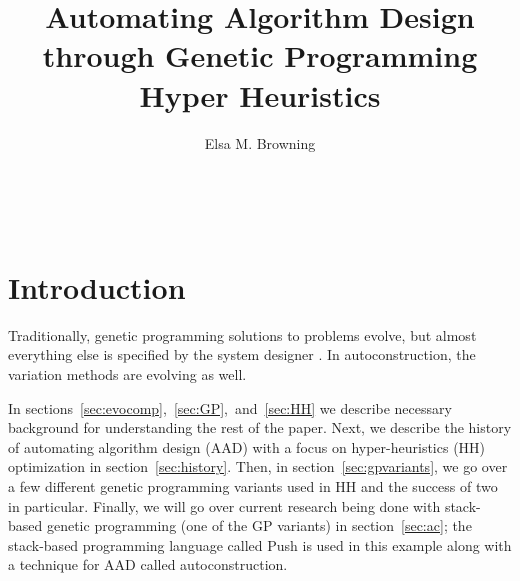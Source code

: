 \documentclass{sig-alternate}
\begin{document}

\title{Automating Algorithm Design through Genetic Programming Hyper Heuristics}


\author{
\alignauthor
Elsa M. Browning\\
	\\
	\\
	\\
}

\maketitle
\begin{abstract}
	
\end{abstract}


\section{Introduction}
\label{sec:introduction}

Traditionally, genetic programming solutions to problems evolve, but almost everything else is specified by the system designer \cite{spector:2016}. In autoconstruction, the variation methods are evolving as well.

In sections~\ref{sec:evocomp},~\ref{sec:GP},~and~\ref{sec:HH} we describe necessary background for understanding the rest of the paper. Next, we describe the history of automating algorithm design (AAD) with a focus on hyper-heuristics (HH) optimization in section~\ref{sec:history}. Then, in section~\ref{sec:gpvariants}, we go over a few different genetic programming variants used in HH and the success of two in particular. Finally, we will go over current research being done with stack-based genetic programming (one of the GP variants) in section~\ref{sec:ac}; the stack-based programming language called Push is used in this example along with a technique for AAD called autoconstruction.
\end{document}

